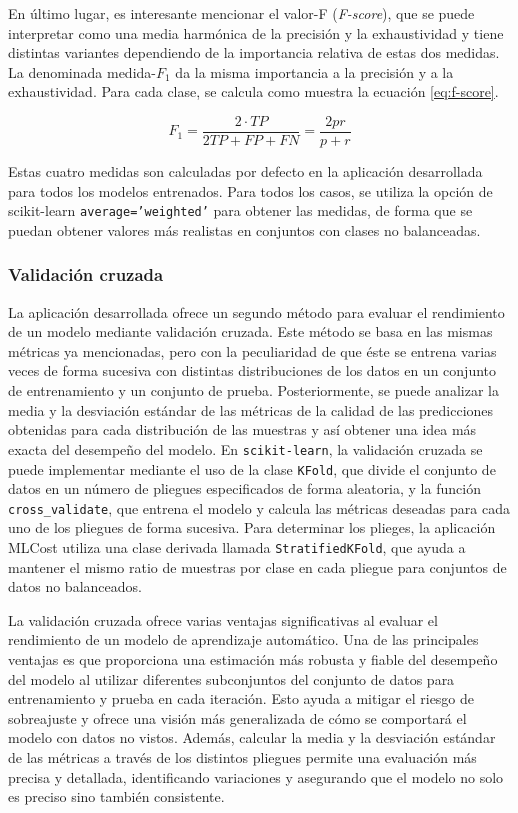 En último lugar, es interesante mencionar el valor-F (\emph{F-score}), que se puede interpretar como una media harmónica de la precisión y la exhaustividad y tiene distintas variantes dependiendo de la importancia relativa de estas dos medidas. La denominada medida-$F_1$ da la misma importancia a la precisión y a la exhaustividad. Para cada clase, se calcula como muestra la ecuación \ref{eq:f-score}.

\begin{equation}
    F_1 = \dfrac{2\cdot TP}{2TP + FP + FN} = \dfrac{2pr}{p+r}
\label{eq:f-score}
\end{equation}

Estas cuatro medidas son calculadas por defecto en la aplicación desarrollada para todos los modelos entrenados. Para todos los casos, se utiliza la opción de scikit-learn \texttt{average='weighted'} para obtener las medidas, de forma que se puedan obtener valores más realistas en conjuntos con clases no balanceadas.

\subsubsection{Validación cruzada}

La aplicación desarrollada ofrece un segundo método para evaluar el rendimiento de un modelo mediante validación cruzada. Este método se basa en las mismas métricas ya mencionadas, pero con la peculiaridad de que éste se entrena varias veces de forma sucesiva con distintas distribuciones de los datos en un conjunto de entrenamiento y un conjunto de prueba. Posteriormente, se puede analizar la media y la desviación estándar de las métricas de la calidad de las predicciones obtenidas para cada distribución de las muestras y así obtener una idea más exacta del desempeño del modelo. En \texttt{scikit-learn}, la validación cruzada se puede implementar mediante el uso de la clase \texttt{KFold}, que divide el conjunto de datos en un número de pliegues especificados de forma aleatoria, y la función \texttt{cross\_validate}, que entrena el modelo y calcula las métricas deseadas para cada uno de los pliegues de forma sucesiva. Para determinar los plieges, la aplicación MLCost utiliza una clase derivada llamada \texttt{StratifiedKFold}, que ayuda a mantener el mismo ratio de muestras por clase en cada pliegue para conjuntos de datos no balanceados.

La validación cruzada ofrece varias ventajas significativas al evaluar el rendimiento de un modelo de aprendizaje automático. Una de las principales ventajas es que proporciona una estimación más robusta y fiable del desempeño del modelo al utilizar diferentes subconjuntos del conjunto de datos para entrenamiento y prueba en cada iteración. Esto ayuda a mitigar el riesgo de sobreajuste y ofrece una visión más generalizada de cómo se comportará el modelo con datos no vistos. Además, calcular la media y la desviación estándar de las métricas a través de los distintos pliegues permite una evaluación más precisa y detallada, identificando variaciones y asegurando que el modelo no solo es preciso sino también consistente.

